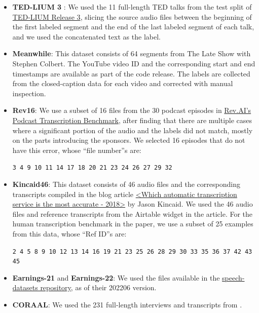 \documentclass[nohyperref]{article}
\theoremstyle{plain}
\theoremstyle{definition}
\theoremstyle{remark}
\begin{document}
\begin{itemize}
\item \textbf{TED-LIUM 3} \cite{Hernandez2018TEDLIUM3T}: We used the 11 full-length TED talks from the test split of \href{https://www.openslr.org/51/}{TED-LIUM Release 3}, slicing the source audio files between the beginning of the first labeled segment and the end of the last labeled segment of each talk, and we used the concatenated text as the label.

\item \textbf{Meanwhile}: This dataset consists of 64 segments from The Late Show with Stephen Colbert. The YouTube video ID and the corresponding start and end timestamps are available as part of the code release. The labels are collected from the closed-caption data for each video and corrected with manual inspection.

\item \textbf{Rev16}: We use a subset of 16 files from the 30 podcast episodes in \href{https://www.rev.ai/blog/podcast-transcription-benchmark-part-1/}{Rev.AI's Podcast Transcription Benchmark}, after finding that there are multiple cases where a significant portion of the audio and the labels did not match, mostly on the parts introducing the sponsors. We selected 16 episodes that do not have this error, whose ``file number''s are:

\begin{center}
    \texttt{3 4 9 10 11 14 17 18 20 21 23 24 26 27 29 32}    
\end{center}

\item \textbf{Kincaid46}: This dataset consists of 46 audio files and the corresponding transcripts compiled in the blog article \href{https://medium.com/descript/which-automatic-transcription-service-is-the-most-accurate-2018-2e859b23ed19}{<Which automatic transcription service is the most accurate - 2018>} by Jason Kincaid. We used the 46 audio files and reference transcripts from the Airtable widget in the article. For the human transcription benchmark in the paper, we use a subset of 25 examples from this data, whose ``Ref ID''s are:

\begin{center}
    \texttt{2 4 5 8 9 10 12 13 14 16 19 21 23 25 26 28 29 30 33 35 36 37 42 43 45}
\end{center}

\item \textbf{Earnings-21} \cite{del2021earnings} and \textbf{Earnings-22}: We used the files available in the \href{https://github.com/revdotcom/speech-datasets}{speech-datasets repository}, as of their 202206 version.

\item \textbf{CORAAL}: We used the 231 full-length interviews and transcripts from \cite{kendall2021coraal}.

\end{itemize}
\end{document}
